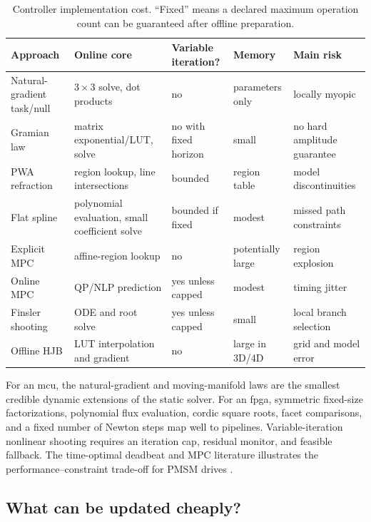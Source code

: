 \begin{table}[tb]
\centering
\caption{Controller implementation cost.  ``Fixed'' means a declared maximum
operation count can be guaranteed after offline preparation.}
\label{tab:dynamic-implementation}
\begin{tabularx}{\linewidth}{@{}lXXXX@{}}
\toprule
Approach & Online core & Variable iteration? & Memory & Main risk\\
\midrule
Natural-gradient task/null & $3\times3$ solve, dot products & no & parameters only & locally myopic\\
Gramian law & matrix exponential/LUT, solve & no with fixed horizon & small & no hard amplitude guarantee\\
PWA refraction & region lookup, line intersections & bounded & region table & model discontinuities\\
Flat spline & polynomial evaluation, small coefficient solve & bounded if fixed & modest & missed path constraints\\
Explicit MPC & affine-region lookup & no & potentially large & region explosion\\
Online MPC & QP/NLP prediction & yes unless capped & modest & timing jitter\\
Finsler shooting & ODE and root solve & yes unless capped & small & local branch selection\\
Offline HJB & LUT interpolation and gradient & no & large in 3D/4D & grid and model error\\
\bottomrule
\end{tabularx}
\end{table}

For an \gls{mcu}, the natural-gradient and moving-manifold laws are the
smallest credible dynamic extensions of the static solver.  For an
\gls{fpga}, symmetric fixed-size factorizations, polynomial flux evaluation,
\gls{cordic} square roots, facet comparisons, and a fixed number of Newton
steps map well to pipelines.  Variable-iteration nonlinear shooting requires
an iteration cap, residual monitor, and feasible fallback.  The time-optimal
deadbeat and MPC literature illustrates the performance--constraint trade-off
for PMSM drives \parencite{lee2014dynamic,brosch2023}.



\subsection{What can be updated cheaply?}

